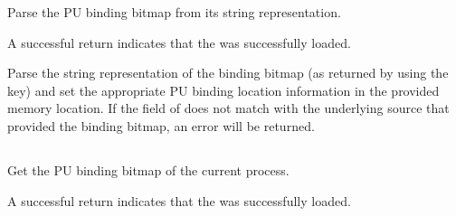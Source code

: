 \summary

Parse the \ac{PU} binding bitmap from its string representation.

\format


\begin{arglist}
\end{arglist}

A successful return indicates that the  was successfully loaded.

\returnsimple

\descr

Parse the string representation of the binding bitmap (as returned by  using the  key) and set the appropriate \ac{PU} binding location information in the provided memory location.
If the  field of  does not match with the underlying source that provided the binding bitmap, an error will be returned.

\subsection{}

\summary

Get the \ac{PU} binding bitmap of the current process.

\format


\begin{arglist}
\end{arglist}

A successful return indicates that the  was successfully loaded.

